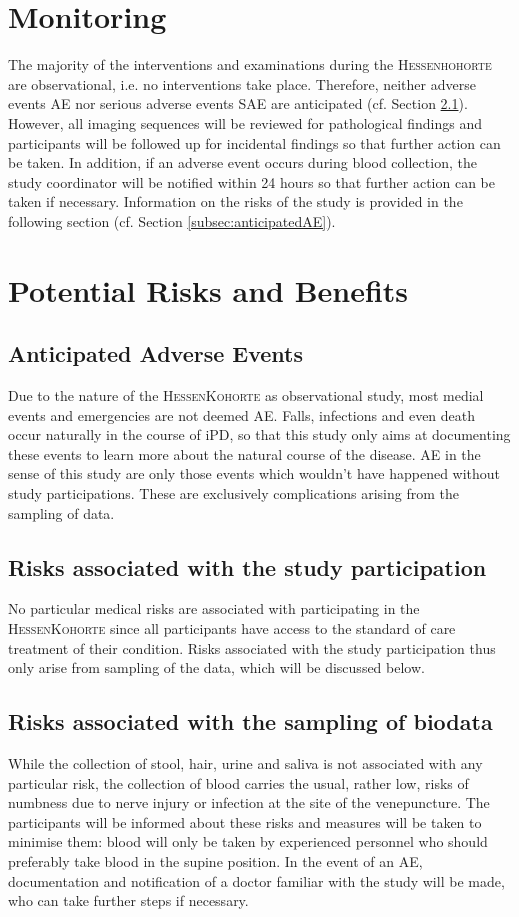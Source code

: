\section{Monitoring}
The majority of the interventions and examinations during the \textsc{Hessenhohorte} are observational, i.e. no interventions take place. Therefore, neither adverse events \ac{AE} nor serious adverse events \ac{SAE} are anticipated (cf. Section \ref{subsec:anticipated_AE}). However, all imaging sequences will be reviewed for pathological findings and participants will be followed up for incidental findings so that further action can be taken. In addition, if an adverse event occurs during blood collection, the study coordinator will be notified within 24 hours so that further action can be taken if necessary. Information on the risks of the study is provided in the following section (cf. Section \ref{subsec:anticipatedAE}).

\section{Potential Risks and Benefits}
\subsection{Anticipated Adverse Events}
\label{subsec:anticipated_AE}
Due to the nature of the \textsc{HessenKohorte} as observational study, most medial events and emergencies are not deemed \acl{AE}. Falls, infections and even death occur naturally in the course of \ac{iPD}, so that this study only aims at documenting these events to learn more about the natural course of the disease. \ac{AE} in the sense of this study are only those events which wouldn't have happened without study participations. These are exclusively complications arising from the sampling of data.

\subsection{Risks associated with the study participation}
No particular medical risks are associated with participating in the \textsc{HessenKohorte} since all participants have access to the standard of
care treatment of their condition. Risks associated with the study participation thus only arise from sampling of the data, which will be
discussed below.

\subsection{Risks associated with the sampling of biodata}
While the collection of stool, hair, urine and saliva is not associated with any particular risk, the collection of blood carries the usual, rather low, risks of numbness due to nerve injury or infection at the site of the venepuncture. The participants will be informed about these risks and measures will be taken to minimise them: blood will only be taken by experienced personnel who should preferably take blood in the supine position. In the event of an \ac{AE}, documentation and notification of a doctor familiar with the study will be made, who can take further steps if necessary. 

